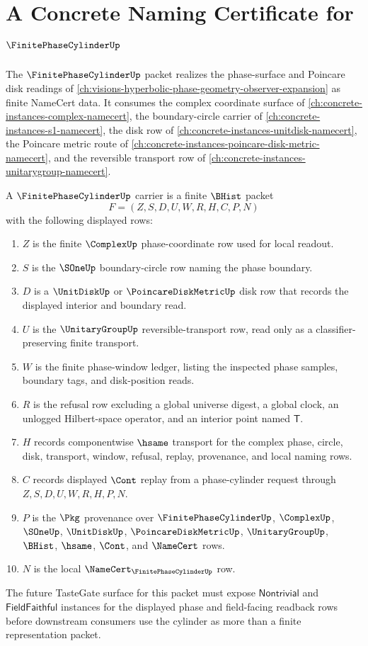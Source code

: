 \chapter{A Concrete Naming Certificate for $\FinitePhaseCylinderUp$}
\label{ch:concrete-instances-finite-phase-cylinder-namecert}

The $\FinitePhaseCylinderUp$ packet realizes the phase-surface and Poincare disk readings of \autoref{ch:visions-hyperbolic-phase-geometry-observer-expansion} as finite NameCert data. It consumes the complex coordinate surface of \autoref{ch:concrete-instances-complex-namecert}, the boundary-circle carrier of \autoref{ch:concrete-instances-s1-namecert}, the disk row of \autoref{ch:concrete-instances-unitdisk-namecert}, the Poincare metric route of \autoref{ch:concrete-instances-poincare-disk-metric-namecert}, and the reversible transport row of \autoref{ch:concrete-instances-unitarygroup-namecert}.

\begin{definition}
\label{def:finite-phase-cylinder-carrier}
A $\FinitePhaseCylinderUp$ carrier is a finite $\BHist$ packet
$$
F=(Z,S,D,U,W,R,H,C,P,N)
$$
with the following displayed rows:
\begin{enumerate}
\item $Z$ is the finite $\ComplexUp$ phase-coordinate row used for local readout.
\item $S$ is the $\SOneUp$ boundary-circle row naming the phase boundary.
\item $D$ is a $\UnitDiskUp$ or $\PoincareDiskMetricUp$ disk row that records the displayed interior and boundary read.
\item $U$ is the $\UnitaryGroupUp$ reversible-transport row, read only as a classifier-preserving finite transport.
\item $W$ is the finite phase-window ledger, listing the inspected phase samples, boundary tags, and disk-position reads.
\item $R$ is the refusal row excluding a global universe digest, a global clock, an unlogged Hilbert-space operator, and an interior point named $\mathsf{T}$.
\item $H$ records componentwise $\hsame$ transport for the complex phase, circle, disk, transport, window, refusal, replay, provenance, and local naming rows.
\item $C$ records displayed $\Cont$ replay from a phase-cylinder request through $Z,S,D,U,W,R,H,P,N$.
\item $P$ is the $\Pkg$ provenance over $\FinitePhaseCylinderUp$, $\ComplexUp$, $\SOneUp$, $\UnitDiskUp$, $\PoincareDiskMetricUp$, $\UnitaryGroupUp$, $\BHist$, $\hsame$, $\Cont$, and $\NameCert$ rows.
\item $N$ is the local $\NameCert_{\FinitePhaseCylinderUp}$ row.
\end{enumerate}
The future TasteGate surface for this packet must expose $\mathsf{Nontrivial}$ and $\mathsf{FieldFaithful}$ instances for the displayed phase and field-facing readback rows before downstream consumers use the cylinder as more than a finite representation packet.
\end{definition}

